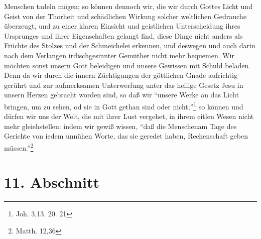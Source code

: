 Menschen tadeln mögen; so können dennoch wir, die wir durch Gottes Licht und
Geist von der Thorheit und schädlichen Wirkung solcher weltlichen Gedrauche
überzeugt, und zu einer klaren Einsicht und geistlichen Unterscheidung ihres
Ursprunges und ihrer Eigenschaften gelangt find, diese Dinge nicht anders als
Früchte des Stolzes und der Schmeichelei erkennen, und deswegen und auch darin
nach dem Verlangen irdischgesinnter Gemüther nicht mehr bequemen. Wir möchten
sonst unsern Gott beleidigen und unsere Gewissen mit Schuld beladen. Denn da wir
durch die innern Züchtigungen der göttlichen Gnade aufrichtig gerührt und zur
aufmerksamen Unterwerfung unter das heilige Gesetz Jesu in unsern Herzen
gebracht worden sind, so daß wir "`unsere Werke an das Licht bringen, um zu
sehen, od sie in Gott gethan sind oder nicht;"'\footnote{Joh. 3,13. 20. 21} so
können und dürfen wir uns der Welt, die mit ihrer Lust vergehet, in ihrem eitlen
Wesen nicht mehr gleiehstellen: indem wir gewiß wissen, "`daß die Menschenam
Tage des Gerichte von iedem unnühen Worte, das sie geredet haben, Rechenschaft
geben müssen."'\footnote{Matth. 12,36}

\section{11. Abschnitt}

